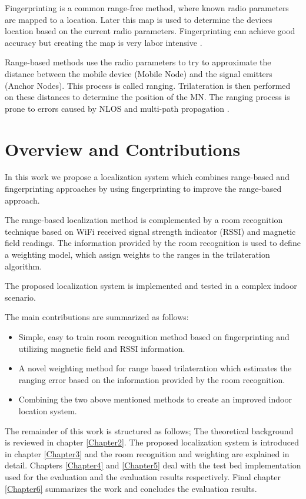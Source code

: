 Fingerprinting is a common range-free method, where known radio parameters are mapped to a location. Later this map is used to determine the devices location based on the current radio parameters. Fingerprinting can achieve good accuracy but creating the map is very labor intensive \cite{FineGrainedIndoorTracking}.

Range-based methods use the radio parameters to try to approximate the distance between the mobile device (Mobile Node) and the signal emitters (Anchor Nodes). This process is called ranging. Trilateration is then performed on these distances to determine the position of the MN. The ranging process is prone to errors caused by NLOS and multi-path propagation \cite{FineGrainedIndoorTracking}.

\section{Overview and Contributions}

In this work we propose a localization system which combines range-based and fingerprinting approaches by using fingerprinting to improve the range-based approach.

The range-based localization method is complemented by a room recognition technique based on WiFi received signal strength indicator (RSSI) and magnetic field readings. The information provided by the room recognition is used to define a weighting model, which assign weights to the ranges in the trilateration algorithm.

The proposed localization system is implemented and tested in a complex indoor scenario.

The main contributions are summarized as follows:
\begin{itemize}
\item Simple, easy to train room recognition method based on fingerprinting and utilizing magnetic field and RSSI information.
\item A novel weighting method for range based trilateration which estimates the ranging error based on the information provided by the room recognition.
\item Combining the two above mentioned methods to create an improved indoor location system.
\end{itemize}

The remainder of this work is structured as follows; The theoretical background is reviewed in chapter \ref{Chapter2}. The proposed localization system is introduced in chapter \ref{Chapter3} and the room recognition and weighting are explained in detail. Chapters \ref{Chapter4} and \ref{Chapter5} deal with the test bed implementation used for the evaluation and the evaluation results respectively. Final chapter \ref{Chapter6} summarizes the work and concludes the evaluation results.
